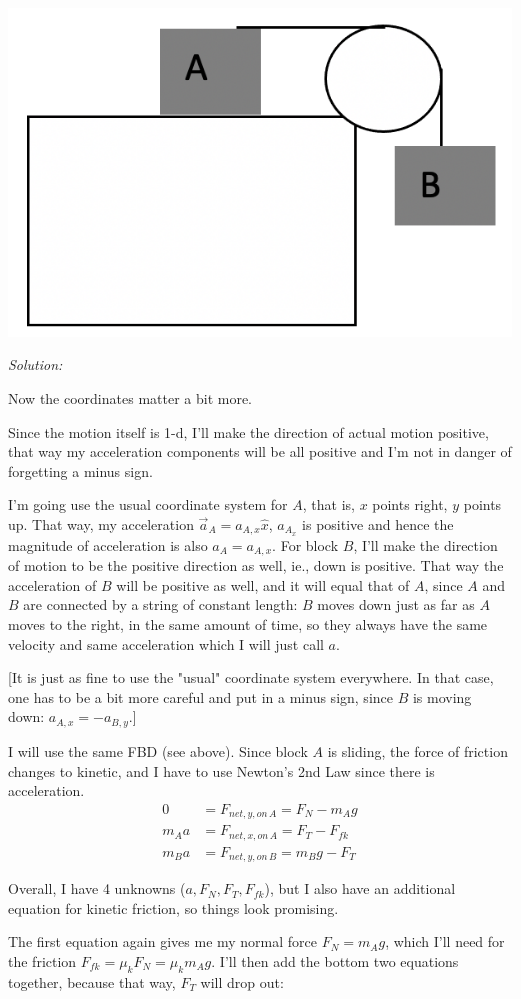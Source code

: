 \documentclass[12pt]{article}
\newcommand{\soln}[1] {\textit{Solution:} #1}
\begin{document}
\begin{enumerate}
\centerline{\includegraphics[width=.3\textwidth]{modified_atwood.png}}

\soln{

Now the coordinates matter a bit more.

Since the motion itself is 1-d, I'll make the direction of actual motion positive, that way my acceleration components will be all positive and I'm not in danger of forgetting a minus sign.

I'm going use the usual coordinate system for $A$, that is, $x$ points right, $y$ points up. That way, my acceleration $\vec a_A = a_{A,x} \hat x$, $a_{A_x}$ is positive and hence the magnitude of acceleration is also $a_A = a_{A,x}$. For block $B$, I'll make the direction of motion to be the positive direction as well, ie., down is positive. That way the acceleration of $B$ will be positive as well, and it will equal that of $A$, since $A$ and $B$ are connected by a string of constant length: $B$ moves down just as far as $A$ moves to the right, in the same amount of time, so they always have the same velocity and same acceleration which I will just call $a$.

[It is just as fine to use the "usual" coordinate system everywhere. In that case, one has to be a bit more careful and put in a minus sign, since $B$ is moving down: $a_{A,x} = - a_{B, y}$.]

I will use the same FBD (see above). Since block $A$ is sliding, the force of friction changes to kinetic, and I have to use Newton's 2nd Law since there is acceleration.
\begin{align}
0 &= F_{net, y, on\, A} = F_{N} - m_A g\\
m_A a &= F_{net, x, on\, A} = F_T - F_{fk}\\
m_B a &= F_{net, y, on\, B} = m_B g - F_T
\end{align}

Overall, I have 4 unknowns ($a, F_N, F_T, F_{fk}$), but I also have an additional equation for kinetic friction, so things look promising.

The first equation again gives me my normal force $F_N = m_A g$, which I'll need for the friction $F_{fk} = \mu_k F_N = \mu_k m_A g$.
I'll then add the bottom two equations together, because that way, $F_T$ will drop out:

}
\end{enumerate}
\end{document}
